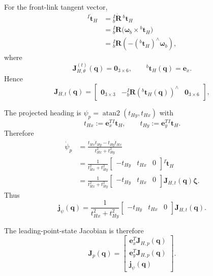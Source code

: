 \documentclass[12pt,a4paper]{report}
\begin{document}
For the front-link tangent vector,
\begin{align}
{}^{I}\dot{\mathbf{t}}_H
&= {}_{b}^{I}\dot{\mathbf{R}}\,{}^{b}\mathbf{t}_H \\
&= {}_{b}^{I}\mathbf{R}\bigl(\boldsymbol{\omega}_b \times {}^{b}\mathbf{t}_H\bigr) \\
&= {}_{b}^{I}\mathbf{R}
\left(
-({}^{b}\mathbf{t}_H)^\wedge \boldsymbol{\omega}_b
\right),
\end{align}
where
\begin{equation}
\mathbf{J}_{H,\theta}^{(t)}(\mathbf{q}) = \mathbf{0}_{3\times6},
\qquad
{}^{b}\mathbf{t}_H(\mathbf{q}) = \mathbf{e}_x.
\end{equation}
Hence
\begin{equation}
\mathbf{J}_{H,t}(\mathbf{q}) =
\begin{bmatrix}
\mathbf{0}_{3\times3} &
-{}_{b}^{I}\mathbf{R}({}^{b}\mathbf{t}_H(\mathbf{q}))^\wedge &
\mathbf{0}_{3\times6}
\end{bmatrix},
\end{equation}

The projected heading is $\psi_p = \operatorname{atan2}(t_{Hy},t_{Hx})$ with
\begin{equation}
t_{Hx} := \mathbf{e}_x^T {}^{I}\mathbf{t}_H,
\qquad
t_{Hy} := \mathbf{e}_y^T {}^{I}\mathbf{t}_H.
\end{equation}
Therefore
\begin{align}
\dot{\psi}_p
&=
\frac{t_{Hx}\dot{t}_{Hy} - t_{Hy}\dot{t}_{Hx}}{t_{Hx}^{2} + t_{Hy}^{2}} \\
&=
\frac{1}{t_{Hx}^{2} + t_{Hy}^{2}}
\begin{bmatrix}
-t_{Hy} & t_{Hx} & 0
\end{bmatrix}
{}^{I}\dot{\mathbf{t}}_H \\
&=
\frac{1}{t_{Hx}^{2} + t_{Hy}^{2}}
\begin{bmatrix}
-t_{Hy} & t_{Hx} & 0
\end{bmatrix}
\mathbf{J}_{H,t}(\mathbf{q})\boldsymbol{\zeta}.
\end{align}
Thus
\begin{equation}
\mathbf{j}_{\psi}(\mathbf{q}) =
\frac{1}{t_{Hx}^{2} + t_{Hy}^{2}}
\begin{bmatrix}
-t_{Hy} & t_{Hx} & 0
\end{bmatrix}
\mathbf{J}_{H,t}(\mathbf{q}).
\end{equation}

The leading-point-state Jacobian is therefore
\begin{equation}
\mathbf{J}_p(\mathbf{q}) =
\begin{bmatrix}
\mathbf{e}_x^T \mathbf{J}_{H,p}(\mathbf{q}) \\
\mathbf{e}_y^T \mathbf{J}_{H,p}(\mathbf{q}) \\
\mathbf{j}_{\psi}(\mathbf{q})
\end{bmatrix}.
\end{equation}
\end{document}
